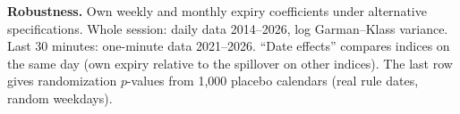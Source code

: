 \begin{table}[t]
\centering
\caption{\textbf{Robustness.} Own weekly and monthly expiry coefficients under alternative specifications. Whole session: daily data 2014--2026, log Garman--Klass variance. Last 30 minutes: one-minute data 2021--2026. ``Date effects'' compares indices on the same day (own expiry relative to the spillover on other indices). The last row gives randomization $p$-values from 1,000 placebo calendars (real rule dates, random weekdays).}
\label{tab:robust}
\scriptsize
\setlength{\tabcolsep}{4pt}
\end{table}
